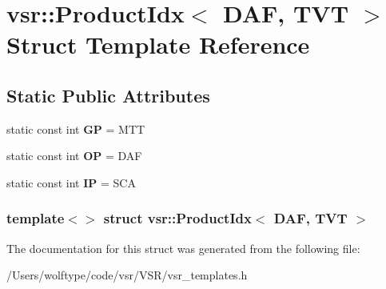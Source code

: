 \hypertarget{structvsr_1_1_product_idx_3_01_d_a_f_00_01_t_v_t_01_4}{\section{vsr\-:\-:Product\-Idx$<$ D\-A\-F, T\-V\-T $>$ Struct Template Reference}
\label{structvsr_1_1_product_idx_3_01_d_a_f_00_01_t_v_t_01_4}
}
\subsection*{Static Public Attributes}
\begin{DoxyCompactItemize}
\item 
\hypertarget{structvsr_1_1_product_idx_3_01_d_a_f_00_01_t_v_t_01_4_a4527afce40c579d68d06a159120e1fa1}{static const int {\bfseries G\-P} = M\-T\-T}\label{structvsr_1_1_product_idx_3_01_d_a_f_00_01_t_v_t_01_4_a4527afce40c579d68d06a159120e1fa1}

\item 
\hypertarget{structvsr_1_1_product_idx_3_01_d_a_f_00_01_t_v_t_01_4_ad6c12d89ad4f61d01e63481d8c6d4ed9}{static const int {\bfseries O\-P} = D\-A\-F}\label{structvsr_1_1_product_idx_3_01_d_a_f_00_01_t_v_t_01_4_ad6c12d89ad4f61d01e63481d8c6d4ed9}

\item 
\hypertarget{structvsr_1_1_product_idx_3_01_d_a_f_00_01_t_v_t_01_4_a9afffe8d3cb511ca466d05e060b9472d}{static const int {\bfseries I\-P} = S\-C\-A}\label{structvsr_1_1_product_idx_3_01_d_a_f_00_01_t_v_t_01_4_a9afffe8d3cb511ca466d05e060b9472d}

\end{DoxyCompactItemize}
\subsubsection*{template$<$$>$ struct vsr\-::\-Product\-Idx$<$ D\-A\-F, T\-V\-T $>$}



The documentation for this struct was generated from the following file\-:\begin{DoxyCompactItemize}
\item 
/\-Users/wolftype/code/vsr/\-V\-S\-R/vsr\-\_\-templates.\-h\end{DoxyCompactItemize}
